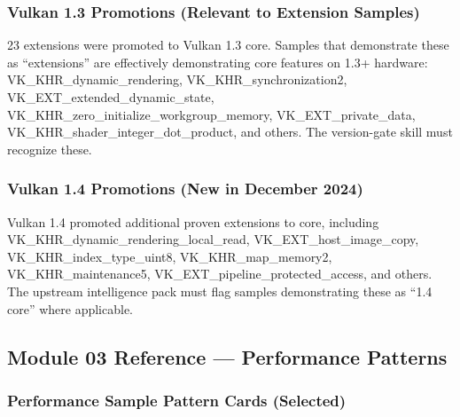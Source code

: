 \documentclass[11pt,letterpaper]{article}
\begin{document}
\subsubsection{Vulkan 1.3 Promotions (Relevant to Extension Samples)}

23 extensions were promoted to Vulkan 1.3 core. Samples that demonstrate these as ``extensions'' are effectively demonstrating core features on 1.3+ hardware: VK\_KHR\_dynamic\_rendering, VK\_KHR\_synchronization2, VK\_EXT\_extended\_dynamic\_state, VK\_KHR\_zero\_initialize\_workgroup\_memory, VK\_EXT\_private\_data, VK\_KHR\_shader\_integer\_dot\_product, and others. The version-gate skill must recognize these.

\subsubsection{Vulkan 1.4 Promotions (New in December 2024)}

Vulkan 1.4 promoted additional proven extensions to core, including VK\_KHR\_dynamic\_rendering\_local\_read, VK\_EXT\_host\_image\_copy, VK\_KHR\_index\_type\_uint8, VK\_KHR\_map\_memory2, VK\_KHR\_maintenance5, VK\_EXT\_pipeline\_protected\_access, and others. The upstream intelligence pack must flag samples demonstrating these as ``1.4 core'' where applicable.

\subsection{Module 03 Reference --- Performance Patterns}

\subsubsection{Performance Sample Pattern Cards (Selected)}
\end{document}

